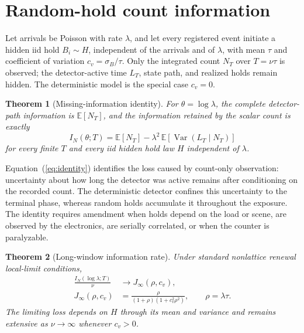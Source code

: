 \documentclass[10pt,twocolumn]{article}
\newtheorem{theorem}{Theorem}
\begin{document}
\section{Random-hold count information}
\label{sec:random-hold}
Let arrivals be Poisson with rate $\lambda$, and let every registered event
initiate a hidden iid hold $B_i\sim H$, independent of the arrivals and of
$\lambda$, with mean $\tau$ and coefficient of variation
$c_v=\sigma_B/\tau$. Only the integrated count $N_T$ over
$T=\nu\tau$ is observed; the detector-active time $L_T$, state path, and
realized holds remain hidden. The deterministic model is the special case
$c_v=0$.

\begin{theorem}[Missing-information identity]
\label{thm:identity}
For $\theta=\log\lambda$, the complete detector-path information is
$\mathbb{E}[N_T]$, and the information retained by the scalar count is exactly
\begin{equation}
 I_N(\theta;T)=\mathbb{E}[N_T]
 -\lambda^2\,\mathbb{E}\!\left[\operatorname{Var}(L_T\mid N_T)\right]
 \label{eq:identity}
\end{equation}
for every finite $T$ and every iid hidden hold law $H$ independent of
$\lambda$.
\end{theorem}

Equation~(\ref{eq:identity}) identifies the loss caused by count-only
observation: uncertainty about how long the detector was active remains after
conditioning on the recorded count. The deterministic detector confines this
uncertainty to the terminal phase, whereas random holds accumulate it throughout
the exposure. The identity requires amendment when holds depend on the load or
scene, are observed by the electronics, are serially correlated, or when the
counter is paralyzable.

\begin{theorem}[Long-window information rate]
\label{thm:rate}
Under standard nonlattice renewal local-limit conditions,
\begin{equation}
 \begin{aligned}
 \frac{I_N(\log\lambda;T)}{\nu}&\longrightarrow J_\infty(\rho,c_v),\\
 J_\infty(\rho,c_v)&=\frac{\rho}{(1+\rho)(1+c_v^2\rho^2)},
 \qquad \rho=\lambda\tau .
 \end{aligned}
 \label{eq:Jinf}
\end{equation}
The limiting loss depends on $H$ through its mean and variance and remains
extensive as $\nu\to\infty$ whenever $c_v>0$.
\end{theorem}
\end{document}
